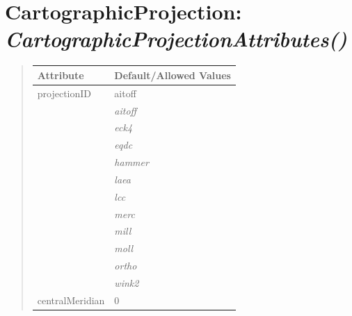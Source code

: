 \documentclass[letterpaper,10pt,english]{sphinxmanual}
\begin{document}
\begin{DUlineblock}{0em}
\item[] 
\end{DUlineblock}

\begin{DUlineblock}{0em}
\item[] 
\end{DUlineblock}


\section{\textbf{CartographicProjection}: \emph{CartographicProjectionAttributes()}}
\label{attributes:cartographicprojection-cartographicprojectionattributes}
\begin{DUlineblock}{0em}
\item[] 
\end{DUlineblock}
\begin{quote}

\begin{tabulary}{\linewidth}{|L|L|}
\hline

\textbf{Attribute}
 & 
\textbf{Default/Allowed Values}
\\
\hline
projectionID
 & 
aitoff
\\
\hline & 
\emph{aitoff}
\\
\hline & 
\emph{eck4}
\\
\hline & 
\emph{eqdc}
\\
\hline & 
\emph{hammer}
\\
\hline & 
\emph{laea}
\\
\hline & 
\emph{lcc}
\\
\hline & 
\emph{merc}
\\
\hline & 
\emph{mill}
\\
\hline & 
\emph{moll}
\\
\hline & 
\emph{ortho}
\\
\hline & 
\emph{wink2}
\\
\hline
centralMeridian
 & 
0
\\
\hline\end{tabulary}

\end{quote}

\begin{DUlineblock}{0em}
\item[] 
\end{DUlineblock}

\begin{DUlineblock}{0em}
\item[] 
\end{DUlineblock}
\end{document}
